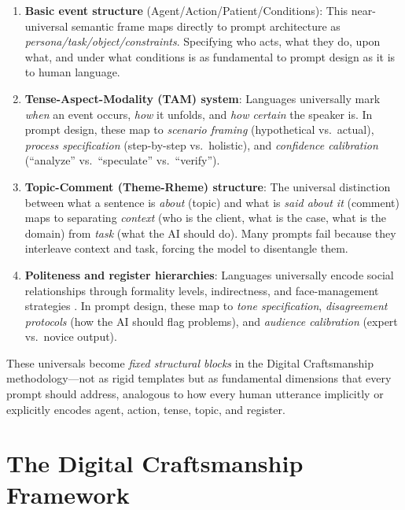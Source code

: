 \documentclass[11pt,a4paper]{article}
\begin{document}
\begin{enumerate}
    \item \textbf{Basic event structure} (Agent/Action/Patient/Conditions): This near-universal semantic frame maps directly to prompt architecture as \emph{persona/task/object/constraints}. Specifying who acts, what they do, upon what, and under what conditions is as fundamental to prompt design as it is to human language.

    \item \textbf{Tense-Aspect-Modality (TAM) system}: Languages universally mark \emph{when} an event occurs, \emph{how} it unfolds, and \emph{how certain} the speaker is. In prompt design, these map to \emph{scenario framing} (hypothetical vs.\ actual), \emph{process specification} (step-by-step vs.\ holistic), and \emph{confidence calibration} (``analyze'' vs.\ ``speculate'' vs.\ ``verify'').

    \item \textbf{Topic-Comment (Theme-Rheme) structure}: The universal distinction between what a sentence is \emph{about} (topic) and what is \emph{said about it} (comment) maps to separating \emph{context} (who is the client, what is the case, what is the domain) from \emph{task} (what the AI should do). Many prompts fail because they interleave context and task, forcing the model to disentangle them.

    \item \textbf{Politeness and register hierarchies}: Languages universally encode social relationships through formality levels, indirectness, and face-management strategies \citep{brown1987politeness}. In prompt design, these map to \emph{tone specification}, \emph{disagreement protocols} (how the AI should flag problems), and \emph{audience calibration} (expert vs.\ novice output).
\end{enumerate}

These universals become \emph{fixed structural blocks} in the Digital Craftsmanship methodology---not as rigid templates but as fundamental dimensions that every prompt should address, analogous to how every human utterance implicitly or explicitly encodes agent, action, tense, topic, and register.

\section{The Digital Craftsmanship Framework}
\label{sec:framework}
\end{document}

